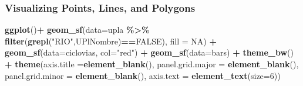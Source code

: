 \documentclass[
  shownotes,
  xcolor={svgnames},
  hyperref={colorlinks,citecolor=DarkBlue,linkcolor=DarkRed,urlcolor=DarkBlue}
  ]{beamer}
\newenvironment{Shaded}{\begin{snugshade}}{\end{snugshade}}
\newcommand{\DataTypeTok}[1]{\textcolor[rgb]{0.13,0.29,0.53}{#1}}
\newcommand{\DecValTok}[1]{\textcolor[rgb]{0.00,0.00,0.81}{#1}}
\newcommand{\KeywordTok}[1]{\textcolor[rgb]{0.13,0.29,0.53}{\textbf{#1}}}
\newcommand{\NormalTok}[1]{#1}
\newcommand{\OperatorTok}[1]{\textcolor[rgb]{0.81,0.36,0.00}{\textbf{#1}}}
\newcommand{\OtherTok}[1]{\textcolor[rgb]{0.56,0.35,0.01}{#1}}
\newcommand{\StringTok}[1]{\textcolor[rgb]{0.31,0.60,0.02}{#1}}
\begin{document}
\begin{frame}[fragile]
\frametitle{Visualizing Points, Lines, and Polygons}


\begin{minipage}[t]{0.52\linewidth}
        \begin{scriptsize}
\begin{Shaded}
\begin{Highlighting}[]
\KeywordTok{ggplot}\NormalTok{()}\OperatorTok{+}
\StringTok{  }\KeywordTok{geom\_sf}\NormalTok{(}\DataTypeTok{data=}\NormalTok{upla }
\OperatorTok{\%\textgreater{}\%}\StringTok{ }\KeywordTok{filter}\NormalTok{(}\KeywordTok{grepl}\NormalTok{(}\StringTok{"RIO"}\NormalTok{,UPlNombre)}\OperatorTok{==}\OtherTok{FALSE}\NormalTok{), }
\DataTypeTok{fill =} \OtherTok{NA}\NormalTok{) }\OperatorTok{+}
\StringTok{  }\KeywordTok{geom\_sf}\NormalTok{(}\DataTypeTok{data=}\NormalTok{ciclovias, }\DataTypeTok{col=}\StringTok{"red"}\NormalTok{) }\OperatorTok{+}
\StringTok{  }\KeywordTok{geom\_sf}\NormalTok{(}\DataTypeTok{data=}\NormalTok{bars) }\OperatorTok{+}
\StringTok{  }\KeywordTok{theme\_bw}\NormalTok{() }\OperatorTok{+}
\StringTok{  }\KeywordTok{theme}\NormalTok{(}\DataTypeTok{axis.title =}\KeywordTok{element\_blank}\NormalTok{(),}
        \DataTypeTok{panel.grid.major =} \KeywordTok{element\_blank}\NormalTok{(),}
        \DataTypeTok{panel.grid.minor =} \KeywordTok{element\_blank}\NormalTok{(),}
        \DataTypeTok{axis.text =} \KeywordTok{element\_text}\NormalTok{(}\DataTypeTok{size=}\DecValTok{6}\NormalTok{))}
\end{Highlighting}
\end{Shaded}
  \end{scriptsize}
    \end{minipage}
    \hfill
    \begin{minipage}[t]{0.43\linewidth}%
       \medskip
        \begin{figure}[H] \centering
            \captionsetup{justification=centering}

\end{figure}
\end{minipage}
\end{frame}
\end{document}

